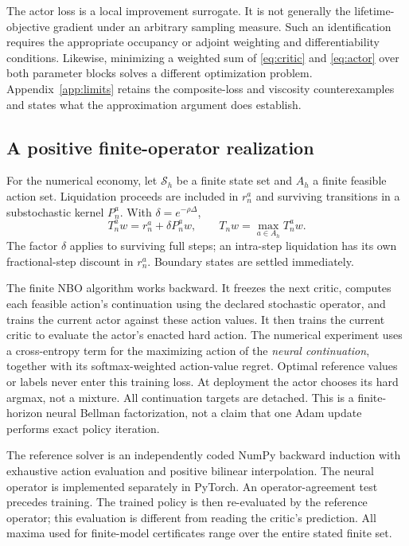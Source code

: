 The actor loss is a local improvement surrogate. It is not generally the lifetime-objective gradient under an arbitrary sampling measure. Such an identification requires the appropriate occupancy or adjoint weighting and differentiability conditions. Likewise, minimizing a weighted sum of \eqref{eq:critic} and \eqref{eq:actor} over both parameter blocks solves a different optimization problem. Appendix~\ref{app:limits} retains the composite-loss and viscosity counterexamples and states what the approximation argument does establish.

\subsection{A positive finite-operator realization}
For the numerical economy, let $\mathcal S_h$ be a finite state set and $A_h$ a finite feasible action set. Liquidation proceeds are included in $r_n^a$ and surviving transitions in a substochastic kernel $P_n^a$. With $\delta=e^{-\rho\Delta}$,
\begin{equation}
T_n^a w=r_n^a+\delta P_n^a w,\qquad T_n w=\max_{a\in A_h}T_n^a w.
\label{eq:finite}
\end{equation}
The factor $\delta$ applies to surviving full steps; an intra-step liquidation has its own fractional-step discount in $r_n^a$. Boundary states are settled immediately.

The finite NBO algorithm works backward. It freezes the next critic, computes each feasible action's continuation using the declared stochastic operator, and trains the current actor against these action values. It then trains the current critic to evaluate the actor's enacted hard action. The numerical experiment uses a cross-entropy term for the maximizing action of the \emph{neural continuation}, together with its softmax-weighted action-value regret. Optimal reference values or labels never enter this training loss. At deployment the actor chooses its hard argmax, not a mixture. All continuation targets are detached. This is a finite-horizon neural Bellman factorization, not a claim that one Adam update performs exact policy iteration.

The reference solver is an independently coded NumPy backward induction with exhaustive action evaluation and positive bilinear interpolation. The neural operator is implemented separately in PyTorch. An operator-agreement test precedes training. The trained policy is then re-evaluated by the reference operator; this evaluation is different from reading the critic's prediction. All maxima used for finite-model certificates range over the entire stated finite set.

